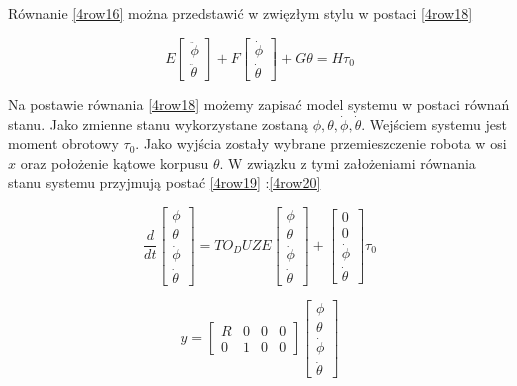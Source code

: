 Równanie \ref{4row16} można przedstawić w zwięzłym stylu w postaci \ref{4row18}

\begin{equation}
\label{4row18} 
E
\begin{bmatrix}	\ddot{\phi}  \\	\ddot{\theta}  \end{bmatrix} +
F
\begin{bmatrix}	\dot{\phi}  \\	\dot{\theta} \end{bmatrix} +
G\theta
=H\tau_0
\end{equation}

Na postawie równania \ref{4row18} możemy zapisać model systemu w postaci równań stanu. Jako zmienne stanu wykorzystane zostaną $\phi, \theta, \dot{\phi}, \dot{\theta}$. Wejściem systemu jest moment obrotowy $\tau_0$. Jako wyjścia zostały wybrane przemieszczenie robota w osi $x$ oraz położenie kątowe korpusu $\theta$. W związku z tymi założeniami równania stanu systemu przyjmują postać  \ref{4row19} :\ref{4row20} 

\begin{equation}
\label{4row19} 
\frac{d}{dt}
\begin{bmatrix}	\phi \\ \theta \\ \dot{\phi}  \\	\dot{\theta}  \end{bmatrix} 
=
TO_DUZE
\begin{bmatrix}		\phi \\ \theta \\\dot{\phi}  \\	\dot{\theta} \end{bmatrix} +
\begin{bmatrix}	0 \\ 0 \\ \dot{\phi}  \\	\dot{\theta} \end{bmatrix}
\tau_0
\end{equation}

\begin{equation}
\label{4row20} 
y=
\begin{bmatrix}	R & 0  & 0&0 \\ 0 & 1 & 0 & 0 \end{bmatrix} 
\begin{bmatrix}	\phi \\ \theta \\ \dot{\phi}  \\	\dot{\theta}  \end{bmatrix} 
\end{equation}


